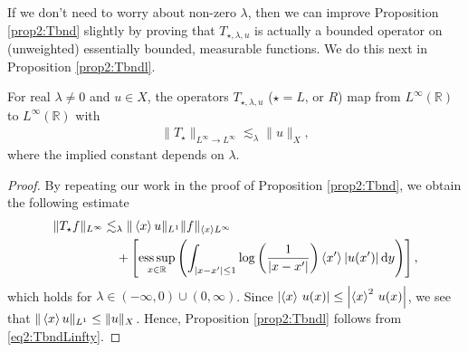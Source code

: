 \documentclass[../dissertation]{subfiles}
\begin{document}
If we don't need to worry about non-zero $\lambda$, then we can 
improve Proposition 
\ref{prop2:Tbnd} slightly by proving that $T_{\star,\lambda,u}$ 
is actually a bounded operator on (unweighted) essentially bounded,
measurable functions. We do this next in Proposition \ref{prop2:Tbndl}.


\begin{prop}\label{prop2:Tbndl}
	For real $\lambda \ne 0$ and $u \in X$, the operators 
	$T_{\star,\lambda,u}$ ($\star = L\text{, or }R$) map from 
	$L^\infty(\mathbb R)$ to $L^\infty(\mathbb R)$
	with
	\begin{align}
		\|T_\star\|_{L^\infty \to L^\infty} 
			\lesssim_\lambda \|u\|_X,
	\end{align}
	where the implied constant depends on $\lambda$.
\end{prop}
\begin{proof}
	By repeating our work in the proof of Proposition 
	\ref{prop2:Tbnd}, we obtain the following estimate
	\begin{align} \label{eq2:TbndLinfty}
		\| T_\star f \|_{L^\infty}
			&\lesssim_{\lambda} \|\left\langle x \right\rangle u\|_{L^1} \|f\|_{\left\langle x \right\rangle L^\infty} \\
			&\quad + \left[ 
					\operatorname*{ess\,sup}_{x\in \mathbb R}  
					\left(
						\int_{|x-x'|\leq 1}
							\log\left(\frac{1}{|x-x'|}\right)
							\left\langle x' \right\rangle|u(x')| 
						\, \mathrm{d}y
					\right)
				\right], \nonumber
	\end{align}
	which holds for $\lambda \in (-\infty,0) \cup (0, \infty)$. Since
	$\left| \left\langle x \right\rangle \, u(x) \right| \leq \left| \left\langle x \right\rangle^2 \, u(x) \right|$,
	we see that $\|\left\langle x \right\rangle u\|_{L^1} \leq \|u\|_X$. Hence, Proposition 
	\ref{prop2:Tbndl} follows from \eqref{eq2:TbndLinfty}.
\end{proof}
\end{document}
